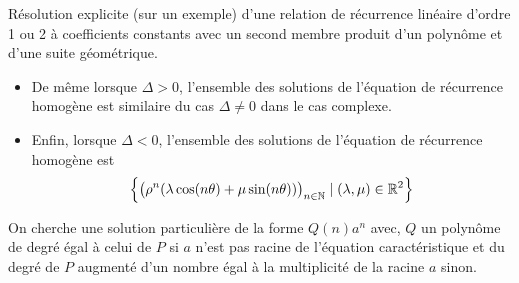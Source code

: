\documentclass{article}
\renewenvironment{question_kholle}[2][ ]
{
	\subsection{\texorpdfstring{#2}{}}
	\notblank{#1}
	{
		\noindent #1
		\bigbreak
	}
	{}
	\begin{proof}
}
{
	\end{proof}
}
\begin{document}
\begin{question_kholle}{Résolution explicite (sur un exemple) d’une
		relation de récurrence linéaire d’ordre 1 ou 2 à coefficients
		constants avec un second membre produit d’un polynôme et d’une
		suite géométrique.}
\begin{itemize}
\begin{itemize}
\begin{itemize}
				                  du cas complexe.
				            \item De même lorsque $\Delta>0$, l’ensemble des
				                  solutions de l’équation de récurrence homogène est
				                  similaire du cas $\Delta\neq 0$ dans le cas complexe.
				            \item Enfin, lorsque $\Delta<0$, l’ensemble des solutions
				                  de l’équation de récurrence homogène est
				                  \[
					                  \Bigl\{\bigl(\rho^{n}(\lambda\cos(n \theta)+\mu\sin(n
					                  \theta))\bigr)_{n\in\mathbb N} \mid (\lambda, \mu)\in\mathbb R^{2}\Bigr\}
				                  \]
			            \end{itemize}
		      \end{itemize}
		      On cherche une solution particulière de la forme $Q(n)a^{n}$
		      avec, $Q$ un polynôme de degré égal à celui de $P$ si $a$ n’est
		      pas racine de l’équation caractéristique et du degré de $P$
		      augmenté d’un nombre égal à la multiplicité de la racine $a$ sinon.
	\end{itemize}

\end{question_kholle}
\end{document}
